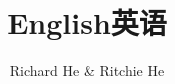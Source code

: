 \documentclass[12pt,twiside,a4paper]{ctexbook}
\numberwithin{chapter}{part}
\begin{document}

\author
{
Richard He \& Ritchie He
}


\title{English英语}
\maketitle
\tableofcontents %
\newpage
\pagestyle{fancy}
\end{document}
